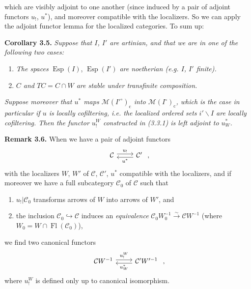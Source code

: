 \documentclass[11pt]{article}
\newcommand{\printedpage}[1]{\marginpar{\footnotesize p.~#1}}
\newcommand{\msp}[1]{\marginpar{\footnotesize [#1]}}
\newcommand{\Esp}{\operatorname{Esp}}
\newcommand{\Fl}{\operatorname{Fl}}
\newcommand{\M}{\mathcal{M}}
\begin{document}
\printedpage{29}
which are visibly adjoint to one another (since induced by a pair of adjoint functors %
$u_!$, $u^*$), and moreover compatible with the localizers. So we can apply the adjoint functor lemma for the localized categories. To sum up:

\textbf{Corollary 3.5.} \textit{Suppose that $I$, $I'$ are artinian, and that we are in one of the following two cases:}
\begin{enumerate}
\item[a)] \textit{The spaces} $\Esp(I)$, $\Esp(I')$ \textit{are noetherian (e.g. $I$, $I'$ finite).}
\msp{page 58}
\item[b)] \textit{$C$ and $TC = C\cap W$ are stable under transfinite composition.}
\end{enumerate}
\textit{Suppose moreover that $u^*$ maps $\M(I'^\circ)_{\mathrm{c}}$ into $\M(I^\circ)_{\mathrm{c}}$, which is the case in particular if $u$ is locally cofiltering, i.e. the localized ordered sets $i'\backslash I$ are locally cofiltering. Then the functor $u_!^W$ constructed in (3.3.1) is left adjoint to $u_W^*$.}

\textbf{Remark 3.6.} When we have a pair of adjoint functors
\[
\begin{tikzcd}
\mathcal{C} \arrow[r, shift left, "u_!"] & \mathcal{C}' \arrow[l, shift left, "u^*"]
\end{tikzcd}
\ ,
\]
with the localizers $W$, $W'$ of $\mathcal{C}$, $\mathcal{C}'$, $u^*$ compatible with the localizers, and if moreover we have a full subcategory $\mathcal{C}_0$ of $\mathcal{C}$ such that
\begin{enumerate}
\item[a)] $u_!|\mathcal{C}_0$ transforms arrows of $W$ into arrows of $W'$, and
\item[b)] the inclusion $\mathcal{C}_0 \hookrightarrow \mathcal{C}$ induces an \textit{equivalence} $\mathcal{C}_0W_0^{-1} \xrightarrow{\sim} \mathcal{C}W^{-1}$ (where $W_0 = W\cap\Fl(\mathcal{C}_0)$),
\end{enumerate}
we find two canonical functors
\[
\begin{tikzcd}
\mathcal{C}W^{-1} \arrow[r, shift left, "u_!^W"] & \mathcal{C}'W'^{-1} \arrow[l, shift left, "u_W^*"]
\end{tikzcd}
\ ,
\]
where $u_!^W$ is defined only up to canonical isomorphism.
\end{document}

